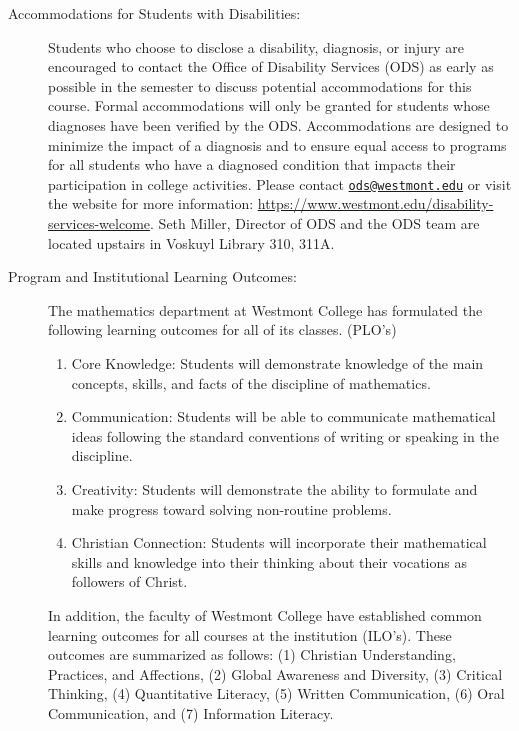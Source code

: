 \documentclass[
  twoside]{article}
\begin{document}
\begin{description}
\clearpage

\item[Accommodations for Students with Disabilities:] Students who choose to disclose a disability, diagnosis, or injury are encouraged to contact the Office of Disability Services (ODS) as early as possible in the semester to discuss potential accommodations for this course. Formal accommodations will only be granted for students whose diagnoses have been verified by the ODS. Accommodations are designed to minimize the impact of a diagnosis and to ensure equal access to programs for all students who have a diagnosed condition that impacts their participation in college activities. Please contact \href{mailto:ods@westmont.edu}{\tt ods@westmont.edu} or visit the website for more information: \url{https://www.westmont.edu/disability-services-welcome}. Seth Miller, Director of ODS and the ODS team are located upstairs in Voskuyl Library 310, 311A. 

\item[Program and Institutional Learning Outcomes:] The
         mathematics department at Westmont College has formulated the
         following learning outcomes for all of its classes. (PLO's)
\begin{enumerate}[noitemsep]
\item Core Knowledge: Students will demonstrate knowledge of the
                  main concepts, skills, and facts of the discipline of
                  mathematics.
\item Communication: Students will be able to communicate mathematical ideas
     following the standard conventions of writing or speaking in the
     discipline.
\item Creativity: Students will demonstrate the ability to formulate and make
     progress toward solving non-routine problems.
\item Christian Connection: Students will incorporate their mathematical skills
     and knowledge into their thinking about their vocations as followers of
     Christ.
         \end{enumerate}
         In addition, the faculty of Westmont College have established common
         learning outcomes for all courses at the institution
         (ILO's). These outcomes are summarized as follows:
(1) Christian Understanding, Practices, and Affections,
(2) Global Awareness and Diversity,
(3) Critical Thinking,
(4) Quantitative Literacy,
(5) Written Communication,
(6) Oral Communication, and
(7) Information Literacy.


\end{description}
\end{document}
